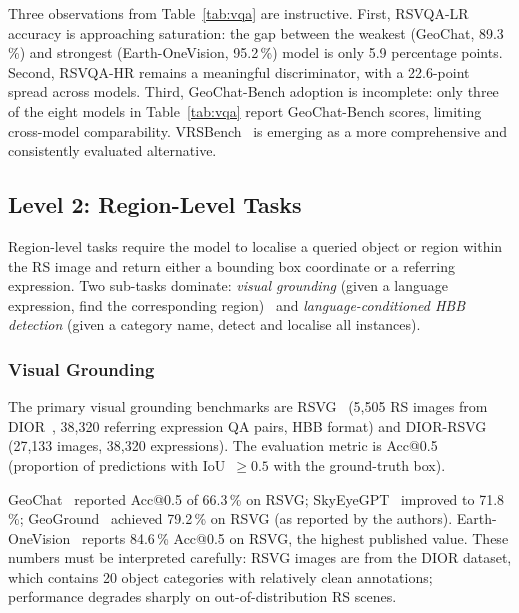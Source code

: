 Three observations from Table~\ref{tab:vqa} are instructive. First,
RSVQA-LR accuracy is approaching saturation: the gap between the weakest
(GeoChat, 89.3\,\%) and strongest (Earth-OneVision, 95.2\,\%) model is only
5.9 percentage points. Second, RSVQA-HR remains a meaningful discriminator,
with a 22.6-point spread across models. Third, GeoChat-Bench adoption is
incomplete: only three of the eight models in Table~\ref{tab:vqa} report
GeoChat-Bench scores, limiting cross-model comparability. VRSBench~\cite{vrsbench2024}
is emerging as a more comprehensive and consistently evaluated alternative.

\subsection{Level 2: Region-Level Tasks}\label{sec4:region}

Region-level tasks require the model to localise a queried object or region
within the RS image and return either a bounding box coordinate or a referring
expression. Two sub-tasks dominate: \emph{visual grounding} (given a language
expression, find the corresponding region)~\cite{liu2023grounding} and \emph{language-conditioned HBB
detection} (given a category name, detect and localise all instances).

\subsubsection{Visual Grounding}\label{sec4:grounding}

The primary visual grounding benchmarks are RSVG~\cite{rsvg2023} (5,505 RS
images from DIOR~\cite{xia2018dota}, 38,320 referring expression QA pairs,
HBB format) and DIOR-RSVG~\cite{diorrsvg2023} (27,133 images, 38,320 expressions).
The evaluation metric is Acc@0.5 (proportion of predictions with
IoU~$\geq\!0.5$ with the ground-truth box).

GeoChat~\cite{geochat2024} reported Acc@0.5 of 66.3\,\% on RSVG;
SkyEyeGPT~\cite{skyeyegpt2025} improved to 71.8\,\%; GeoGround~\cite{geoground2025}
achieved 79.2\,\% on RSVG (as reported by the authors). Earth-OneVision~\cite{earthonevision2026}
reports 84.6\,\% Acc@0.5 on RSVG, the highest published value. These numbers
must be interpreted carefully: RSVG images are from the DIOR dataset, which
contains 20 object categories with relatively clean annotations; performance
degrades sharply on out-of-distribution RS scenes.

